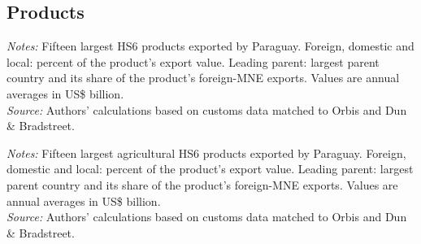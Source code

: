 \documentclass[11pt,a4paper]{article}
\begin{document}
\subsection{Products}
\begin{table}[H]\centering\footnotesize%
  \caption{Paraguay: Fifteen Largest Export Products}%
  \label{tab:c_hs6_PRY}%
  \par\vspace{3pt}%
  \begin{minipage}{0.95\textwidth}\footnotesize %
  \textit{Notes:} Fifteen largest HS6 products exported by Paraguay. Foreign, domestic and local: percent of the product's export value. Leading parent: largest parent country and its share of the product's foreign-MNE exports. Values are annual averages in US\$ billion.\\[3pt]%
  \textit{Source:} Authors' calculations based on customs data matched to Orbis and Dun \& Bradstreet.%
  \end{minipage}%
  \end{table}
\begin{table}[H]\centering\footnotesize%
  \caption{Paraguay, Agriculture: Fifteen Largest Export Products}%
  \label{tab:c_hs6_PRY_agro}%
  \par\vspace{3pt}%
  \begin{minipage}{0.95\textwidth}\footnotesize %
  \textit{Notes:} Fifteen largest agricultural HS6 products exported by Paraguay. Foreign, domestic and local: percent of the product's export value. Leading parent: largest parent country and its share of the product's foreign-MNE exports. Values are annual averages in US\$ billion.\\[3pt]%
  \textit{Source:} Authors' calculations based on customs data matched to Orbis and Dun \& Bradstreet.%
  \end{minipage}%
  \end{table}
\end{document}
